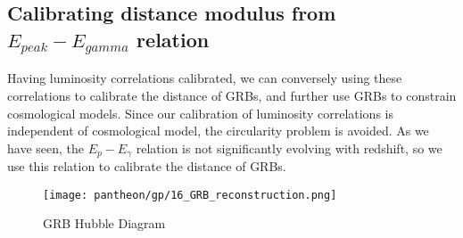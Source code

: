 \subsection{Calibrating distance modulus from $E_{peak}-E_{gamma}$ relation}
Having luminosity correlations calibrated, we can conversely using these correlations to calibrate the distance of GRBs, and further use GRBs to constrain cosmological models. Since our calibration of luminosity correlations is independent of cosmological model, the circularity problem is avoided. As we have seen, the $E_{p}-E_{\gamma}$ relation is not significantly evolving with redshift, so we use this relation to calibrate the distance of GRBs.
\begin{figure}[H]
	\centering
	\texttt{[image: pantheon/gp/16\_GRB\_reconstruction.png]}
	\caption{GRB Hubble Diagram}
	\label{fig:HD_GRB_GP}
\end{figure}
